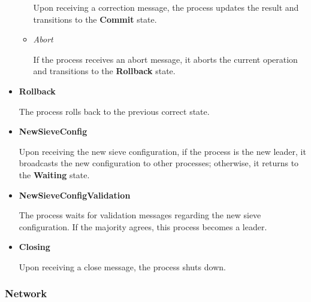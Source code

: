 \documentclass{scrartcl}
\begin{document}
\begin{itemize}
\begin{itemize}
        Upon receiving a correction message, the process updates the result and transitions to the \textbf{Commit} state.
        
        \item \textit{Abort}
        
        If the process receives an abort message, it aborts the current operation and transitions to the \textbf{Rollback} state.
        
    \end{itemize}
    
    \item \textbf{Rollback}
    
    The process rolls back to the previous correct state.
    
    \item \textbf{NewSieveConfig}
    
    Upon receiving the new sieve configuration, if the process is the new leader, it broadcasts the new configuration to other processes; otherwise, it returns to the \textbf{Waiting} state.
    
    \item \textbf{NewSieveConfigValidation}
    
    The process waits for validation messages regarding the new sieve configuration. If the majority agrees, this process becomes a leader.
    
    \item \textbf{Closing}
    
    Upon receiving a close message, the process shuts down.
    
\end{itemize}


\subsubsection{Network}
\end{document}
